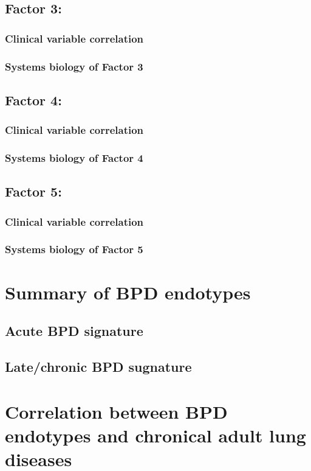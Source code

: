     \subsection{Factor 3: }
        \subsubsection{Clinical variable correlation}
        \subsubsection{Systems biology of Factor 3}
    \subsection{Factor 4: }
        \subsubsection{Clinical variable correlation}
        \subsubsection{Systems biology of Factor 4}
    \subsection{Factor 5: }
        \subsubsection{Clinical variable correlation}
        \subsubsection{Systems biology of Factor 5}

\lipsum[1]

\section{Summary of BPD endotypes}
    \subsection{Acute BPD signature}
    \subsection{Late/chronic BPD sugnature}
    
\section{Correlation between BPD endotypes and chronical adult lung diseases}
